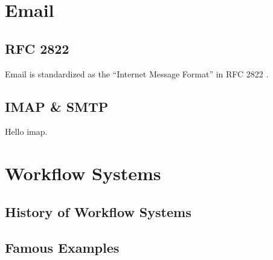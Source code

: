 \section{Email}


\subsection{RFC 2822}

Email is standardized as the ``Internet Message Format'' in RFC 2822 \citep{email}.

\subsection{IMAP \& SMTP}

Hello \gls{imap}.


\section{Workflow Systems}


\subsection{History of Workflow Systems}


\subsection{Famous Examples}